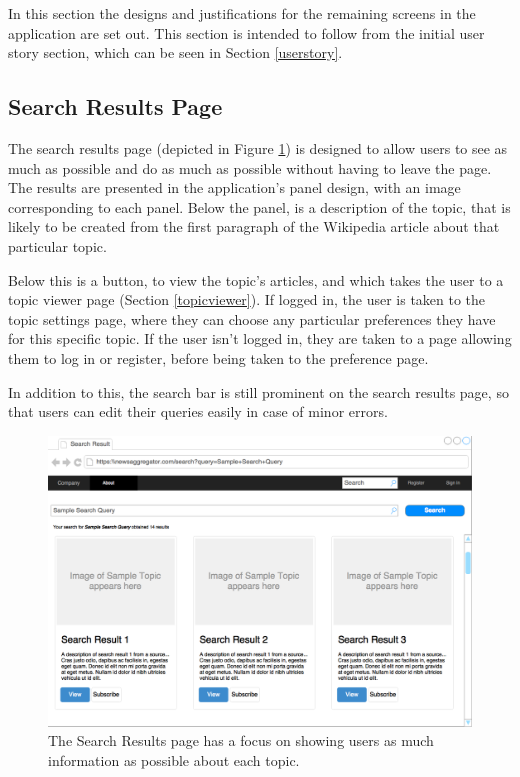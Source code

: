 \documentclass[12pt]{article}
\begin{document}
\begin{appendices}
\label{wireframes}

In this section the designs and justifications for the remaining screens in the application are set out. This section is intended to follow from the initial user story section, which can be seen in Section \ref{userstory}.

\subsection{Search Results Page}

The search results page (depicted in Figure \ref{searchPage}) is designed to allow users to see as much as possible and do as much as possible without having to leave the page. The results are presented in the application's panel design, with an image corresponding to each panel. Below the panel, is a description of the topic, that is likely to be created from the first paragraph of the Wikipedia \cite{wikipedia} article about that particular topic. 

Below this is a button, to view the topic's articles, and which takes the user to a topic viewer page (Section \ref{topicviewer}). If logged in, the user is taken to the topic settings page, where they can choose any particular preferences they have for this specific topic. If the user isn't logged in, they are taken to a page allowing them to log in or register, before being taken to the preference page.

In addition to this, the search bar is still prominent on the search results page, so that users can edit their queries easily in case of minor errors.

\label{searchresults}

\begin{figure}[ht!]
  \centering
    \includegraphics[scale=0.3]{SearchPage.png}
   \caption[A wireframe of the Search Results page]{The Search Results page has a focus on showing users as much information as possible about each topic.}
   \label{searchPage}
\end{figure}


\end{appendices}
\end{document}
